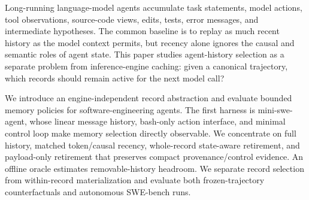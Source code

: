 \documentclass[11pt]{article}
\begin{document}
\begin{abstract}
Finally, per-request omission can reverse end-to-end: one six-issue policy
resolves 6/6 and omits 55.34\% against its own trajectory, yet expands from 60
to 114 calls and consumes 43.87\% more input than paired Full.  We therefore
report own omission, paired cumulative work, task success, and action cost
separately.  The surviving policies are promotion candidates rather than
production defaults; native K/V realization belongs to a separate runtime
contract.
\end{abstract}

\iffalse
Long-running language-model agents accumulate task statements, model actions,
tool observations, source-code views, edits, tests, error messages, and
intermediate hypotheses. The common baseline is to replay as much recent
history as the model context permits, but recency alone ignores the causal and
semantic roles of agent state. This paper studies agent-history selection as a
separate problem from inference-engine caching: given a canonical trajectory,
which records should remain active for the next model call?

We introduce an engine-independent record abstraction and evaluate bounded
memory policies for software-engineering agents. The first harness is
mini-swe-agent, whose linear message history, bash-only action interface, and
minimal control loop make memory selection directly observable. We concentrate
on full history, matched token/causal recency, whole-record state-aware
retirement, and payload-only retirement that preserves compact
provenance/control evidence. An offline oracle estimates removable-history
headroom. We separate record selection from within-record materialization and
evaluate both frozen-trajectory counterfactuals and autonomous SWE-bench runs.
\end{document}
